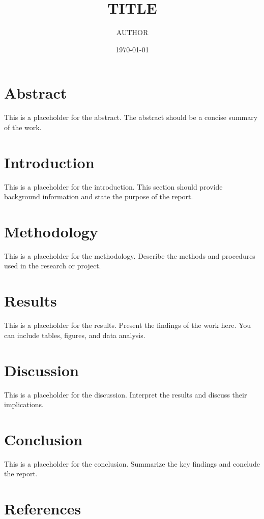 \documentclass[11pt]{article}
\title{\textbf{{{TITLE}}}}
\author{{{AUTHOR}}}
\date{\today}
\begin{document}
\maketitle
\tableofcontents
\newpage

\section*{Abstract}
This is a placeholder for the abstract. The abstract should be a concise summary of the work.

\section{Introduction}
This is a placeholder for the introduction. This section should provide background information and state the purpose of the report.

\section{Methodology}
This is a placeholder for the methodology. Describe the methods and procedures used in the research or project.

\section{Results}
This is a placeholder for the results. Present the findings of the work here. You can include tables, figures, and data analysis.

\section{Discussion}
This is a placeholder for the discussion. Interpret the results and discuss their implications.

\section{Conclusion}
This is a placeholder for the conclusion. Summarize the key findings and conclude the report.


\section*{References}
\printbibliography
\end{document}
